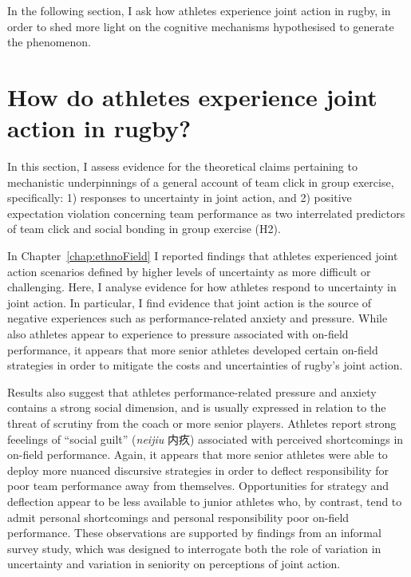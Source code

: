 \begin{CJK}{UTF8}{gbsn}
In the following section, I ask how athletes experience joint action in rugby, in order to shed more light on the cognitive mechanisms hypothesised to generate the phenomenon.



























\section{How do athletes experience joint action in rugby?\label{sect:athleteExperienceJA}}
In this section, I assess evidence for the theoretical claims pertaining to mechanistic underpinnings of a general account of team click in group exercise, specifically: 1) responses to uncertainty in joint action, and 2) positive expectation violation concerning team performance as two interrelated predictors of team click and social bonding in group exercise (H2).

In Chapter~\ref{chap:ethnoField} I reported findings that athletes experienced joint action scenarios defined by higher levels of uncertainty as more difficult or challenging.  Here, I analyse evidence for how athletes respond to uncertainty in joint action.  In particular, I find evidence that joint action is the source of negative experiences such as performance-related anxiety and pressure.  While also athletes appear to experience to pressure associated with on-field performance, it appears that more senior athletes developed certain on-field strategies in order to mitigate the costs and uncertainties of rugby's joint action.

Results also suggest that athletes performance-related pressure and anxiety contains a strong social dimension, and is usually expressed in relation to the threat of scrutiny from the coach or more senior players.  Athletes report strong feeelings of ``social guilt'' (\textit{neijiu} 内疚) associated with perceived shortcomings in on-field performance.  Again, it appears that more senior athletes were able to deploy more nuanced discursive strategies in order to deflect responsibility for poor team performance away from themselves.  Opportunities for strategy and deflection appear to be less available to junior athletes who, by contrast, tend to admit personal shortcomings and personal responsibility poor on-field performance.  These observations are supported by findings from an informal survey study, which was designed to interrogate both the role of variation in uncertainty and variation in seniority on perceptions of joint action.


\end{CJK}

